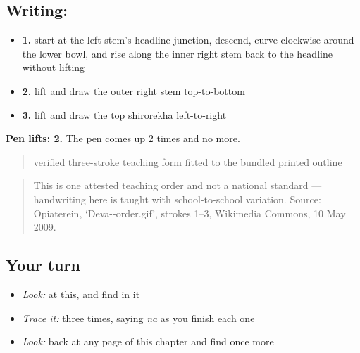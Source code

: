 \subsection*{Writing: }

\begin{itemize}
\raggedright
  \item \textbf{1.} start at the left stem's headline junction, descend, curve clockwise around the lower bowl, and rise along the inner right stem back to the headline without lifting
  \item \textbf{2.} lift and draw the outer right stem top-to-bottom
  \item \textbf{3.} lift and draw the top shirorekhā left-to-right
\end{itemize}

\textbf{Pen lifts: 2.} The pen comes up 2 times and no more.

\begin{quote}
verified three-stroke teaching form fitted to the bundled printed outline
\end{quote}

\begin{quote}
This is one attested teaching order and not a national standard — handwriting here is taught with school-to-school variation. Source: Opiaterein, ‘Deva--order.gif’, strokes 1–3, Wikimedia Commons, 10 May 2009.
\end{quote}

\subsection*{Your turn}
\begin{itemize}
\raggedright
  \item \emph{Look:} at this, and find  in it
\end{itemize}

\begin{quote}
\end{quote}

\begin{itemize}
\raggedright
  \item \emph{Trace it:}  three times, saying \emph{ṇa} as you finish each one
  \item \emph{Look:} back at any page of this chapter and find  once more
\end{itemize}

